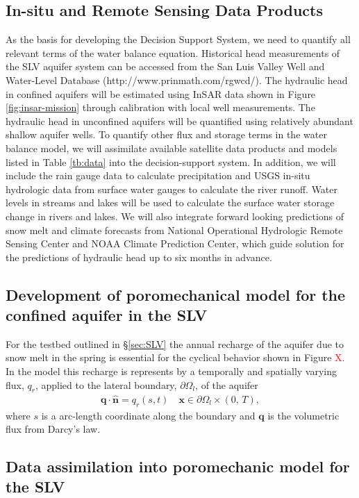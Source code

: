 \documentclass[11pt,final]{article}%
\newcommand{\note}[1]{\textcolor{red}{ #1}}
\begin{document}
\subsection{In-situ and Remote Sensing Data Products}
As the basis for developing the Decision Support System, we need to quantify all relevant terms of the water balance equation. Historical head measurements of the SLV aquifer system can be accessed from the San Luis Valley Well and Water-Level Database (http://www.prinmath.com/rgwcd/). The hydraulic head in confined aquifers will be estimated using InSAR data shown in Figure \ref{fig:insar-mission} through calibration with local well measurements. The hydraulic head in unconfined aquifers will be quantified using relatively abundant shallow aquifer wells. To quantify other flux and storage terms in the water balance model, we will assimilate available satellite data products and models listed in Table \ref{tb:data} into the decision-support system. In addition, we will include the rain gauge data to calculate precipitation and USGS in-situ hydrologic data from surface water gauges to calculate the river runoff. Water levels in streams and lakes will be used to calculate the surface water storage change in rivers and lakes. We will also integrate forward looking predictions of snow melt and climate forecasts from National Operational Hydrologic Remote Sensing Center and NOAA Climate Prediction Center, which guide solution for the predictions of hydraulic head up to six months in advance.

\subsection{Development of poromechanical model for the confined aquifer in the SLV}\label{sec:proposed forward}

For the testbed outlined in \S\ref{sec:SLV} the annual recharge of the aquifer due to snow melt in the spring is essential for the cyclical behavior shown in Figure \note{X}. In the model this recharge is represents by a temporally and spatially varying flux, $q_r$, applied to the lateral boundary, $\partial\Omega_l$, of the aquifer
\begin{align}
    \mathbf{q}\cdot\hat{\mathbf{n}} = q_r(s,t)\quad \mathbf{x} \in \partial\Omega_l \times (0,\,T),
\end{align}
where $s$ is a arc-length coordinate along the boundary and $\mathbf{q}$ is the volumetric flux from Darcy's law.

\subsection{Data assimilation into poromechanic model for the SLV}\label{sec:proposed inverse}
\end{document}
